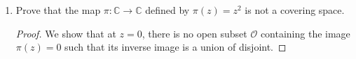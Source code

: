 \documentclass{article}
\begin{document}
\begin{enumerate}
\begin{enumerate}
      \item Prove that the map $\pi:\mathbb{C}\rightarrow\mathbb{C}$
        defined by $\pi(z)=z^2$ is not a covering space.

        \begin{proof}
          We show that at $z=0$, there is no open subset $\mathcal{O}$
          containing the image $\pi(z)=0$ such that its inverse image is a
          union of disjoint.
        \end{proof}
    \end{enumerate}
\end{enumerate}
\end{document}
